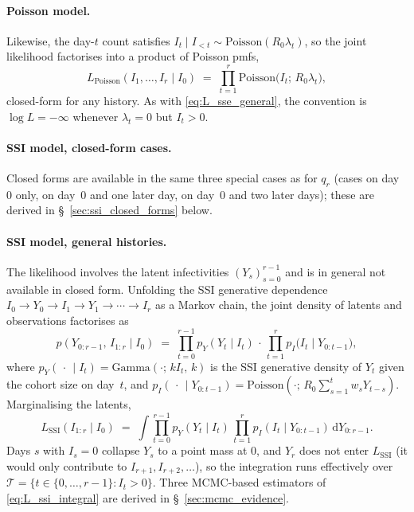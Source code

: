\documentclass{article}
\theoremstyle{definition}
\begin{document}
\paragraph{Poisson model.}  Likewise, the day-$t$ count satisfies
$I_t \mid I_{<t} \sim \mathrm{Poisson}(R_0 \lambda_t)$, so the joint
likelihood factorises into a product of Poisson pmfs,
\begin{equation}\label{eq:L_poisson_general}
  L_\mathrm{Poisson}(I_1, \ldots, I_r \mid I_0)
  \;=\; \prod_{t=1}^r \mathrm{Poisson}\!\bigl(I_t;\, R_0 \lambda_t\bigr),
\end{equation}
closed-form for any history.  As with \eqref{eq:L_sse_general}, the
convention is $\log L = -\infty$ whenever $\lambda_t = 0$ but $I_t > 0$.

\paragraph{SSI model, closed-form cases.}  Closed forms are available in the
same three special cases as for $q_r$ (cases on day~$0$ only, on day~$0$ and
one later day, on day~$0$ and two later days); these are derived in
\S~\ref{sec:ssi_closed_forms} below.

\paragraph{SSI model, general histories.}  The likelihood involves the
latent infectivities $(Y_s)_{s=0}^{r-1}$ and is in general not available in
closed form.  Unfolding the SSI generative dependence
$I_0 \to Y_0 \to I_1 \to Y_1 \to \cdots \to I_r$ as a Markov chain, the
joint density of latents and observations factorises as
\begin{equation}\label{eq:joint_ssi}
  p(Y_{0:r-1},\, I_{1:r} \mid I_0)
  \;=\; \prod_{t=0}^{r-1} p_Y(Y_t \mid I_t)
  \,\cdot\,
  \prod_{t=1}^{r} p_I\!\bigl(I_t \mid Y_{0:t-1}\bigr),
\end{equation}
where $p_Y(\,\cdot\, \mid I_t) = \mathrm{Gamma}(\cdot;\, kI_t,\, k)$ is the
SSI generative density of $Y_t$ given the cohort size on day~$t$, and
$p_I(\,\cdot\, \mid Y_{0:t-1}) = \mathrm{Poisson}(\cdot;\, R_0
\sum_{s=1}^{t} w_s Y_{t-s})$.  Marginalising the latents,
\begin{equation}\label{eq:L_ssi_integral}
  L_\mathrm{SSI}(I_{1:r} \mid I_0)
  \;=\; \int \!\prod_{t=0}^{r-1} p_Y(Y_t \mid I_t)
  \,\prod_{t=1}^{r} p_I(I_t \mid Y_{0:t-1})\, \mathrm{d}Y_{0:r-1}.
\end{equation}
Days $s$ with $I_s = 0$ collapse $Y_s$ to a point mass at $0$, and $Y_r$
does not enter $L_\mathrm{SSI}$ (it would only contribute to $I_{r+1},
I_{r+2}, \ldots$), so the integration runs effectively over
$\mathcal{T} = \{t \in \{0,\ldots,r-1\} : I_t > 0\}$.  Three MCMC-based
estimators of \eqref{eq:L_ssi_integral} are derived in
\S~\ref{sec:mcmc_evidence}.
\end{document}
